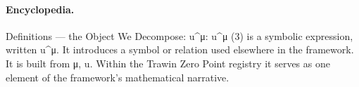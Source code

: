 \paragraph{Encyclopedia.}
Definitions — the Object We Decompose: u\textasciicircum{}μ: u\textasciicircum{}μ (3) is a symbolic expression, written u\textasciicircum{}μ. It introduces a symbol or relation used elsewhere in the framework. It is built from μ, u. Within the Trawin Zero Point registry it serves as one element of the framework's mathematical narrative.
